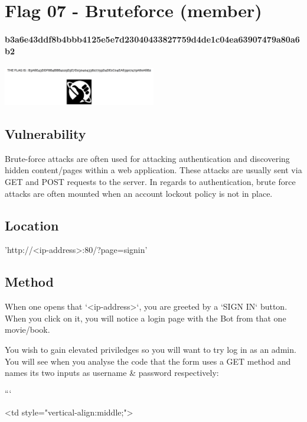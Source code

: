 \section{Flag 07 - Bruteforce (member)}

\paragraph{b3a6e43ddf8b4bbb4125e5e7d23040433827759d4de1c04ea63907479a80a6b2}
\begin{center}
    \includegraphics[width=0.5\textwidth]{10.Flag07/07-04.png}\\[0cm] 
\end{center}

\subsection{Vulnerability}

Brute-force attacks are often used for attacking authentication and discovering hidden content/pages within a web application. These attacks are usually sent via GET and POST requests to the server. In regards to authentication, brute force attacks are often mounted when an account lockout policy is not in place.

\subsection{Location}

'http://<ip-address>:80/?page=signin'

\subsection{Method}

When one opens that `<ip-address>`, you are greeted by a `SIGN IN` button. When you click on it, you will notice a login page with the Bot from that one movie/book.

You wish to gain elevated priviledges so you will want to try log in as an admin. You will see when you analyse the code that the form uses a GET method and names its two inputs as username \& password respectively:


```

<td style="vertical-align:middle;">
  
